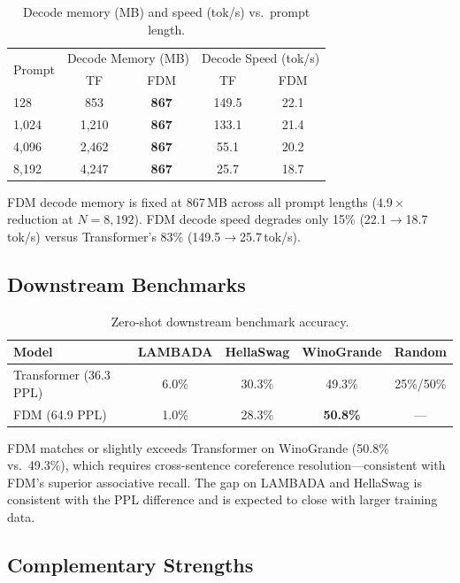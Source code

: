 \documentclass{article}
\begin{document}
\begin{table}[h]
\centering
\caption{Decode memory (MB) and speed (tok/s) vs.\ prompt length.}
\label{tab:inference}
\begin{tabular}{lcccc}
\toprule
\multirow{2}{*}{Prompt} &
\multicolumn{2}{c}{Decode Memory (MB)} &
\multicolumn{2}{c}{Decode Speed (tok/s)} \\
& TF & FDM & TF & FDM \\
\midrule
128   & 853   & \textbf{867} & 149.5 & 22.1 \\
1,024 & 1,210 & \textbf{867} & 133.1 & 21.4 \\
4,096 & 2,462 & \textbf{867} & 55.1  & 20.2 \\
8,192 & 4,247 & \textbf{867} & 25.7  & 18.7 \\
\bottomrule
\end{tabular}
\end{table}

FDM decode memory is fixed at 867\,MB across all prompt lengths
($4.9\times$ reduction at $N{=}8{,}192$).
FDM decode speed degrades only 15\% (22.1$\to$18.7\,tok/s)
versus Transformer's 83\% (149.5$\to$25.7\,tok/s).

\subsection{Downstream Benchmarks}

\begin{table}[h]
\centering
\caption{Zero-shot downstream benchmark accuracy.}
\label{tab:downstream}
\begin{tabular}{lcccc}
\toprule
Model & LAMBADA & HellaSwag & WinoGrande & Random \\
\midrule
Transformer (36.3 PPL) & 6.0\% & 30.3\% & 49.3\% & 25\%/50\% \\
FDM (64.9 PPL) & 1.0\% & 28.3\% & \textbf{50.8\%} & --- \\
\bottomrule
\end{tabular}
\end{table}

FDM matches or slightly exceeds Transformer on WinoGrande (50.8\% vs.\ 49.3\%),
which requires cross-sentence coreference resolution---consistent with FDM's
superior associative recall.
The gap on LAMBADA and HellaSwag is consistent with the PPL difference
and is expected to close with larger training data.

\subsection{Complementary Strengths}
\end{document}
